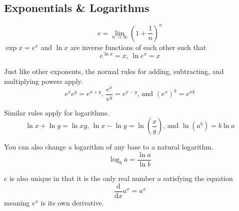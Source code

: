 \subsection{Exponentials \& Logarithms}
\noindent
\begin{equation*}
	e = \lim\limits_{n\rightarrow\infty}{\left(1+\frac{1}{n}\right)^n}
\end{equation*}
$\exp{x} = e^x$ and $\ln{x}$ are inverse functions of each other such that
\begin{equation*}
	e^{\ln{x}} = x \text{, } \ln{e^x} = x
\end{equation*}

\noindent
Just like other exponents, the normal rules for adding, subtracting, and multiplying powers apply.
\begin{equation*}
	e^xe^y = e^{x+y}\text{, }\frac{e^x}{e^y}=e^{x-y}\text{, and }\left(e^x\right)^k=e^{xk}
\end{equation*}

\noindent
Similar rules apply for logarithms.
\begin{equation*}
	\ln{x}+\ln{y} = \ln{xy}\text{, }\ln{x}-\ln{y} = \ln{\left(\frac{x}{y}\right)}\text{, and }\ln{\left(a^b\right)}=b\ln{a}
\end{equation*}

\noindent
You can also change a logarithm of any base to a natural logarithm.
\begin{equation*}
	\log_{b}{a} = \frac{\ln{a}}{\ln{b}}
\end{equation*}

\noindent
$e$ is also unique in that it is the only real number $a$ satisfying the equation
\begin{equation*}
	\frac{\mathrm{d}}{\mathrm{d}x}a^x = a^x
\end{equation*}
meaning $e^x$ is its own derivative.